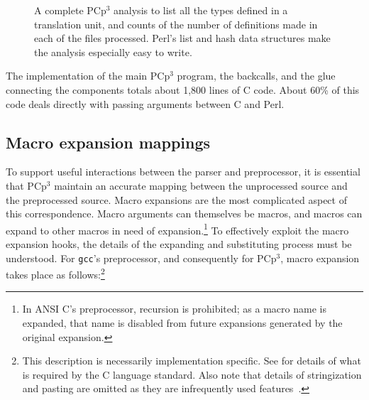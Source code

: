 \documentclass{article}
\newcommand{\pcp}{\mbox{\textsf{PCp}$^3$}}
\newcommand{\Perl}{\mbox{Perl}}
\newcommand{\C}{\mbox{C}}
\begin{document}
\begin{figure}[hbtp]
\begin{center}
\begin{small}
\end{small}
\caption{A complete \pcp{} analysis to list all the types defined in a
  translation unit, and counts of the number of definitions made in each
  of the files processed.  \Perl{}'s list and hash data structures make
  the analysis especially easy to write.}
\label{fig:complete_analysis}
\end{center}
\end{figure}


The implementation of the main \pcp{} program, the backcalls, and the
glue connecting the components totals about 1,800 lines of \C{}
code.  About 60\% of this code deals directly with passing arguments
between \C{} and \Perl{}.


\subsection{Macro expansion mappings}
To support useful interactions between the parser and preprocessor, it
is essential that \pcp{} maintain an accurate mapping between the
unprocessed source and the preprocessed source.  Macro expansions are
the most complicated aspect of this correspondence.  Macro arguments can
themselves be macros, and macros can expand to other macros in need of
expansion.\footnote{In ANSI \C{}'s preprocessor, recursion is
  prohibited; as a macro name is expanded, that name is disabled from
  future expansions generated by the original expansion.}  To
effectively exploit the macro expansion hooks, the details of the
expanding and substituting process must be understood.  For
\texttt{gcc}'s preprocessor, and consequently for \pcp{}, macro
expansion takes place as follows:\footnote{This description is necessarily
  implementation specific.  See \cite[Ch.~3]{Harbison91} for details of
  what is required by the \C{} language standard.  Also note that
  details of stringization and pasting are omitted as they are
  infrequently used features~\cite{EmpCpp}.}
\end{document}
